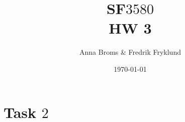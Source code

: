 \documentclass[a4paper]{article}
\title{SF$3580$\\HW 3}
\author{Anna Broms \& Fredrik Fryklund}
\date{\today}
\begin{document}
\maketitle

 \section*{Task $2$}
 
%
%
\end{document}
